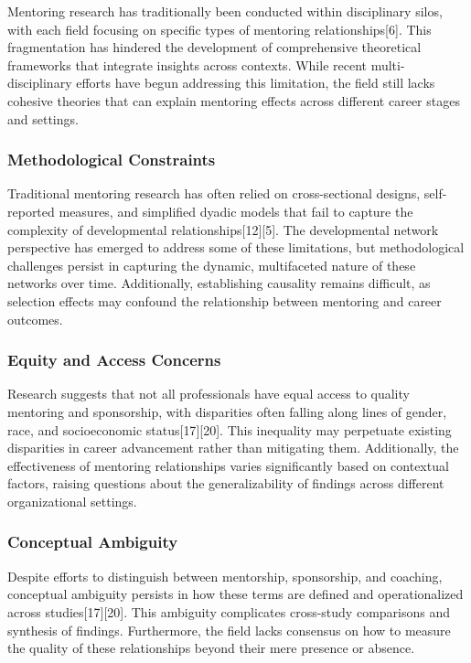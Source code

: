 \documentclass[
  letterpaper,
  DIV=11,
  numbers=noendperiod]{scrartcl}
\begin{document}
Mentoring research has traditionally been conducted within disciplinary
silos, with each field focusing on specific types of mentoring
relationships{[}6{]}. This fragmentation has hindered the development of
comprehensive theoretical frameworks that integrate insights across
contexts. While recent multi-disciplinary efforts have begun addressing
this limitation, the field still lacks cohesive theories that can
explain mentoring effects across different career stages and settings.

\subsubsection{Methodological
Constraints}\label{methodological-constraints}

Traditional mentoring research has often relied on cross-sectional
designs, self-reported measures, and simplified dyadic models that fail
to capture the complexity of developmental relationships{[}12{]}{[}5{]}.
The developmental network perspective has emerged to address some of
these limitations, but methodological challenges persist in capturing
the dynamic, multifaceted nature of these networks over time.
Additionally, establishing causality remains difficult, as selection
effects may confound the relationship between mentoring and career
outcomes.

\subsubsection{Equity and Access
Concerns}\label{equity-and-access-concerns}

Research suggests that not all professionals have equal access to
quality mentoring and sponsorship, with disparities often falling along
lines of gender, race, and socioeconomic status{[}17{]}{[}20{]}. This
inequality may perpetuate existing disparities in career advancement
rather than mitigating them. Additionally, the effectiveness of
mentoring relationships varies significantly based on contextual
factors, raising questions about the generalizability of findings across
different organizational settings.

\subsubsection{Conceptual Ambiguity}\label{conceptual-ambiguity}

Despite efforts to distinguish between mentorship, sponsorship, and
coaching, conceptual ambiguity persists in how these terms are defined
and operationalized across studies{[}17{]}{[}20{]}. This ambiguity
complicates cross-study comparisons and synthesis of findings.
Furthermore, the field lacks consensus on how to measure the quality of
these relationships beyond their mere presence or absence.
\end{document}
